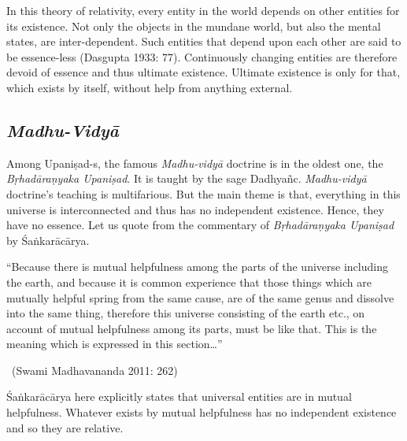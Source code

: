 In this theory of relativity, every entity in the world depends on other entities for its existence. Not only the objects in the mundane world, but also the mental states, are inter-dependent. Such entities that depend upon each other are said to be essence-less (Dasgupta 1933: 77). Continuously changing entities are therefore devoid of essence and thus ultimate existence. Ultimate existence is only for that, which exists by itself, without help from anything external.

\newpage

\subsection*{\textit{Madhu-Vidyā}}

\vspace{-.3cm}

Among Upaniṣad-s, the famous \textit{Madhu-vidyā} doctrine is in the oldest one, the \textit{Bṛhadāraṇyaka Upaniṣad}. It is taught by the sage Dadhyañc. \textit{Madhu-vidyā} doctrine’s teaching is multifarious. But the main theme is that, everything in this universe is interconnected and thus has no independent existence. Hence, they have no essence. Let us quote from the commentary of \textit{Bṛhadāraṇyaka Upaniṣad} by Śaṅkarācārya.

\begin{myquote}
“Because there is mutual helpfulness among the parts of the universe including the earth, and because it is common experience that those things which are mutually helpful spring from the same cause, are of the same genus and dissolve into the same thing, therefore this universe consisting of the earth etc., on account of mutual helpfulness among its parts, must be like that. This is the meaning which is expressed in this section…” 

~\hfill (Swami Madhavananda 2011: 262)
\end{myquote}

Śaṅkarācārya here explicitly states that universal entities are in mutual helpfulness. Whatever exists by mutual helpfulness has no independent existence and so they are relative.

